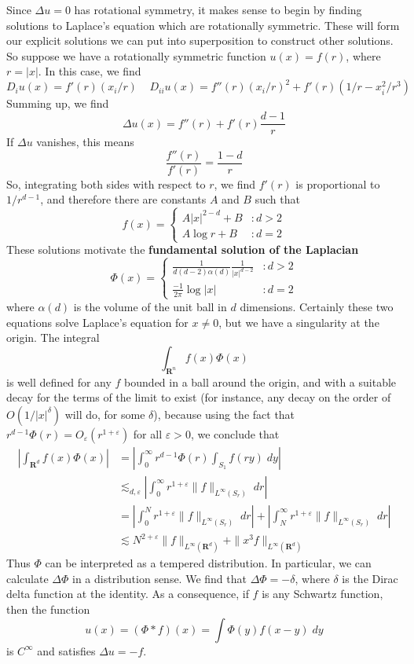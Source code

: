 Since $\Delta u = 0$ has rotational symmetry, it makes sense to begin by finding solutions to Laplace's equation which are rotationally symmetric. These will form our explicit solutions we can put into superposition to construct other solutions. So suppose we have a rotationally symmetric function $u(x) = f(r)$, where $r = |x|$. In this case, we find
%
\[ D_iu(x) = f'(r) (x_i/r)\ \ \ \ \ D_{ii} u(x) = f''(r) (x_i/r)^2 + f'(r)(1/r - x_i^2/r^3) \]
%
Summing up, we find
%
\[ \Delta u(x) = f''(r) + f'(r) \frac{d - 1}{r} \]
%
If $\Delta u$ vanishes, this means
%
\[ \frac{f''(r)}{f'(r)} = \frac{1 - d}{r} \]
%
So, integrating both sides with respect to $r$, we find $f'(r)$ is proportional to $1/r^{d-1}$, and therefore there are constants $A$ and $B$ such that
%
\[ f(x) = \begin{cases} A|x|^{2-d} + B & : d > 2 \\ A \log r + B & : d = 2 \end{cases} \]
%
These solutions motivate the {\bf fundamental solution of the Laplacian}
%
\[ \Phi(x) = \begin{cases} \frac{1}{d(d-2) \alpha(d)} \frac{1}{|x|^{d-2}} & : d > 2 \\ \frac{-1}{2 \pi} \log |x| & : d = 2 \end{cases} \]
%
where $\alpha(d)$ is the volume of the unit ball in $d$ dimensions. Certainly these two equations solve Laplace's equation for $x \neq 0$, but we have a singularity at the origin. The integral
%
\[ \int_{\mathbf{R}^n} f(x) \Phi(x) \]
%
is well defined for any $f$ bounded in a ball around the origin, and with a suitable decay for the terms of the limit to exist (for instance, any decay on the order of $O(1/|x|^\delta)$ will do, for some $\delta$), because using the fact that $r^{d-1} \Phi(r) = O_\varepsilon(r^{1 + \varepsilon})$ for all $\varepsilon > 0$, we conclude that
%
\begin{align*}
    \left| \int_{\mathbf{R}^d} f(x) \Phi(x) \right| &= \left| \int_0^\infty r^{d-1} \Phi(r) \int_{S_1} f(ry)\; dy \right|\\
    &\lesssim_{d,\varepsilon} \left| \int_0^\infty r^{1 + \varepsilon} \| f \|_{L^\infty(S_r)}\; dr \right|\\
    &= \left| \int_0^N r^{1 + \varepsilon} \| f \|_{L^\infty(S_r)}\; dr \right| + \left| \int_N^\infty r^{1 + \varepsilon} \| f \|_{L^\infty(S_r)}\; dr \right|\\
    &\lesssim N^{2 + \varepsilon} \| f \|_{L^\infty(\mathbf{R}^d)} + \| x^3 f \|_{L^\infty(\mathbf{R}^d)}
\end{align*}
%
Thus $\Phi$ can be interpreted as a tempered distribution. In particular, we can calculate $\Delta \Phi$ in a distribution sense. We find that $\Delta \Phi = -\delta$, where $\delta$ is the Dirac delta function at the identity. As a consequence, if $f$ is any Schwartz function, then the function
%
\[ u(x) = (\Phi * f)(x) = \int \Phi(y) f(x - y)\; dy \]
%
is $C^\infty$ and satisfies $\Delta u = - f$.

